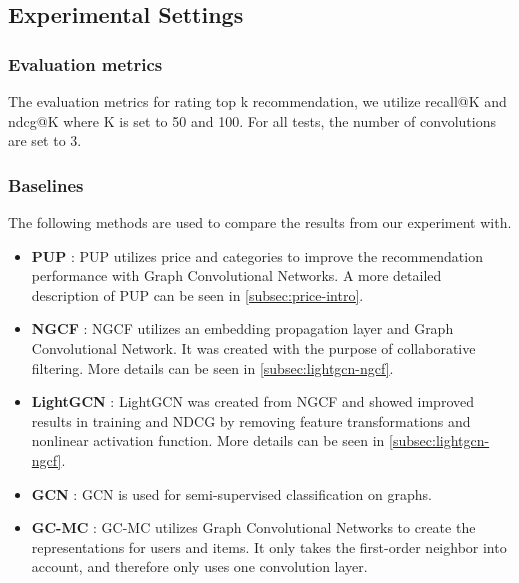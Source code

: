 \subsection{Experimental Settings}
\subsubsection{Evaluation metrics}
The evaluation metrics for rating top k recommendation, we utilize recall@K and ndcg@K where K is set to 50 and 100.
For all tests, the number of convolutions are set to 3.

\subsubsection{Baselines}
The following methods are used to compare the results from our experiment with.
\begin{itemize}
    \item \textbf{PUP} \cite{Priceaware}: PUP utilizes price and categories to improve the recommendation performance with Graph Convolutional Networks. A more detailed description of PUP can be seen in \autoref{subsec:price-intro}.
    \item \textbf{NGCF} \cite{NGCF_2019}: NGCF utilizes an embedding propagation layer and Graph Convolutional Network. It was created with the purpose of collaborative filtering. More details can be seen in \autoref{subsec:lightgcn-ngcf}.
    \item \textbf{LightGCN} \cite{lightgcn}: LightGCN was created from NGCF and showed improved results in training and NDCG by removing feature transformations and nonlinear activation function. More details can be seen in \autoref{subsec:lightgcn-ngcf}.
    \item \textbf{GCN} \cite{kipf2017semisupervised}: GCN is used for semi-supervised classification on graphs.
    \item \textbf{GC-MC} \cite{berg2017graph}: GC-MC utilizes Graph Convolutional Networks to create the representations for users and items. It only takes the first-order neighbor into account, and therefore only uses one convolution layer.
\end{itemize}